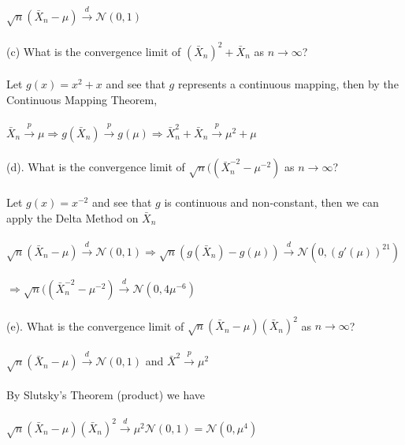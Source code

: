 \documentclass{article}
\begin{document}
\begin{itemize}
    $\sqrt{n}(\bar{X}_n-\mu)\xrightarrow{d}\mathcal{N}(0,1)$\\\\
    (c) What is the convergence limit of $(\bar{X}_n)^2+\bar{X}_n$ as $n\rightarrow\infty$?\\\\
    Let $g(x)=x^2+x$ and see that $g$ represents a continuous mapping, then by the Continuous Mapping Theorem,\\\\
    $\bar{X}_n\xrightarrow{p}\mu\Rightarrow g(\bar{X}_n)\xrightarrow{p} g(\mu)\Rightarrow\bar{X}_n^2+\bar{X}_n\xrightarrow{p}\mu^2+\mu$\\\\
    (d). What is the convergence limit of $\sqrt{n}((\bar{X}_n^{-2}-\mu^{-2})$ as $n\rightarrow\infty$?\\\\
    Let $g(x)=x^{-2}$ and see that $g$ is continuous and non-constant, then we can apply the Delta Method on $\bar{X}_n$\\\\
    $\sqrt{n}(\bar{X}_n-\mu)\xrightarrow{d}\mathcal{N}(0,1)\Rightarrow\sqrt{n}(g(\bar{X}_n)-g(\mu))\xrightarrow{d}\mathcal{N}(0,(g'(\mu))^21)$\\\\
    $\Rightarrow \sqrt{n}((\bar{X}_n^{-2}-\mu^{-2})\xrightarrow{d}\mathcal{N}(0,4\mu^{-6})$\\\\
    (e). What is the convergence limit of $\sqrt{n}(\bar{X}_n-\mu)(\bar{X}_n)^2$ as $n\rightarrow\infty$?\\\\
    $\sqrt{n}(\bar{X}_n-\mu)\xrightarrow{d}\mathcal{N}(0,1)$ and $\bar{X}^2\xrightarrow{p}\mu^2$\\\\
    By Slutsky's Theorem (product) we have\\\\
    $\sqrt{n}(\bar{X}_n-\mu)(\bar{X}_n)^2\xrightarrow{d}\mu^2\mathcal{N}(0,1)=\mathcal{N}(0,\mu^4)$
\end{itemize}
\pagebreak
\end{document}
